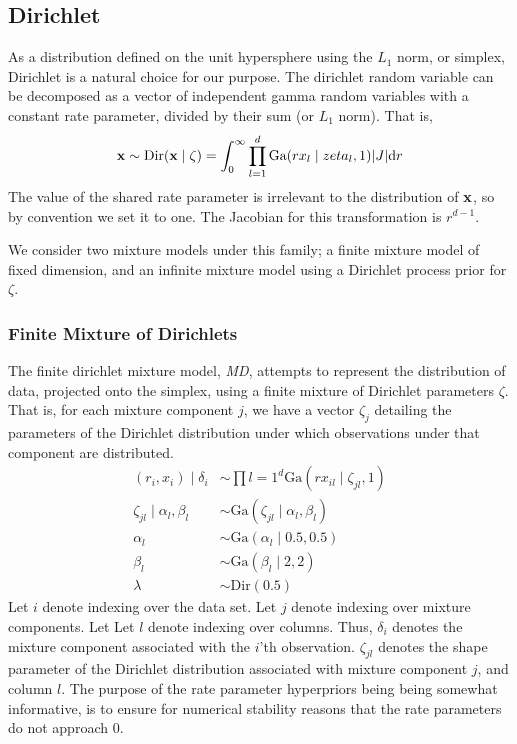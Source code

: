 \subsection{Dirichlet}
As a distribution defined on the unit hypersphere using the $L_1$ norm, or simplex, Dirichlet is a
  natural choice for our purpose.  The dirichlet random variable can be decomposed as a vector of
  independent gamma random variables with a constant rate parameter, divided by their sum
  (or $L_1$ norm). That is,
  \begin{equation}
    \label{eq:dirichletrv}
    {\bf x} \sim \text{Dir}({\bf x} \mid \zeta) =
        \int_0^{\infty}\prod_{l = 1}^d\text{Ga}(rx_l \mid zeta_l, 1)\lvert J\rvert\text{d}r
  \end{equation}
  The value of the shared rate parameter is irrelevant to the distribution of ${\bf x}$, so by
  convention we set it to one.  The Jacobian for this transformation is $r^{d-1}$.

We consider two mixture models under this family; a finite mixture model of fixed dimension, and an
  infinite mixture model using a Dirichlet process prior for $\zeta$.

\subsubsection{Finite Mixture of Dirichlets}
\label{model:md}
The finite dirichlet mixture model, \emph{MD}, attempts to represent the distribution of data, projected onto
  the simplex, using a finite mixture of Dirichlet parameters $\zeta$.  That is, for each mixture
  component $j$, we have a vector $\zeta_j$ detailing the parameters of the Dirichlet distribution
  under which observations under that component are distributed.
  \begin{equation}
    \label{eq:fmdirichlet}
    \begin{aligned}
      (r_i, x_i) \mid \delta_i &\sim \prod{l = 1}^d\text{Ga}(rx_{il}\mid \zeta_{jl}, 1)\\
            \zeta_{jl} \mid \alpha_l,\beta_l &\sim \text{Ga}(\zeta_{jl}\mid \alpha_l, \beta_l)\\
            \alpha_l &\sim \text{Ga}(\alpha_l \mid 0.5, 0.5)\\
            \beta_l &\sim \text{Ga}(\beta_l \mid 2, 2)\\
            \lambda &\sim \text{Dir}(0.5)
    \end{aligned}
  \end{equation}
  Let $i$ denote indexing over the data set.  Let $j$ denote indexing over mixture components.  Let
  Let $l$ denote indexing over columns. Thus, $\delta_i$ denotes the mixture component associated
  with the $i$'th observation.  $\zeta_{jl}$ denotes the shape parameter of the Dirichlet
  distribution associated with mixture component $j$, and column $l$.  The purpose of the rate
  parameter hyperpriors being being somewhat informative, is to ensure for numerical stability
  reasons that the rate parameters do not approach 0.

